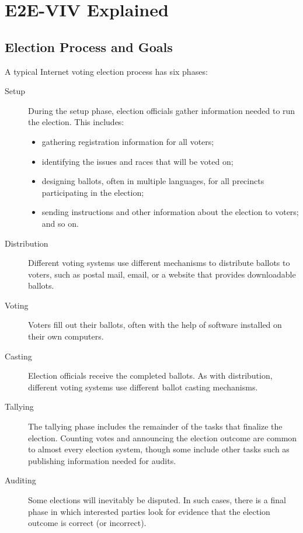 \chapter{E2E-VIV Explained}
\label{chapter:e2e_viv_explained}


\section{Election Process and Goals}
A typical Internet voting election process has six phases:

\begin{description}
  \item[Setup] During the setup phase, election officials gather 
    information needed to run the election. This includes:
    \begin{itemize}
     \item gathering registration information for all voters;
     \item identifying the issues and races that will be voted on;
     \item designing ballots, often in multiple languages, for all
       precincts participating in the election;
     \item sending instructions and other information about the
       election to voters; and so on.
    \end{itemize}
  \item[Distribution] Different voting systems use different
    mechanisms to distribute ballots to voters, such as postal mail,
    email, or a website that provides downloadable ballots.
  \item[Voting] Voters fill out their ballots, often with the help of
    software installed on their own computers.
  \item[Casting] Election officials receive the completed ballots. As
    with distribution, different voting systems use different ballot
    casting mechanisms.
  \item[Tallying] The tallying phase includes the remainder of the
    tasks that finalize the election. Counting votes and announcing
    the election outcome are common to almost every election system,
    though some include other tasks such as publishing information
    needed for audits.
  \item[Auditing] Some elections will inevitably be disputed. In such
    cases, there is a final phase in which interested parties look for
    evidence that the election outcome is correct (or incorrect).
\end{description}

